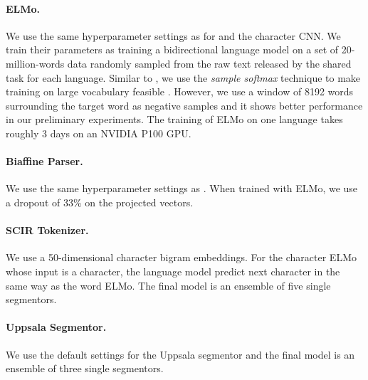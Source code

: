 \documentclass[11pt,a4paper]{article}
\begin{document}
\paragraph{ELMo.}
We use the same hyperparameter settings as \citet{N18-1202} for 
and the character CNN.
We train their parameters
as training a bidirectional language model
on a set of 20-million-words data randomly
sampled from the raw text released by the shared task for each language.
Similar to \citet{N18-1202}, we use the \textit{sample softmax} technique
to make training on large vocabulary feasible \cite{jean-EtAl:2015:ACL-IJCNLP}.
However, we use a window of 8192 words surrounding the target word
as negative samples and it shows better performance in our preliminary experiments.
The training of ELMo on one language takes roughly 3 days on an NVIDIA P100 GPU.

\paragraph{Biaffine Parser.}
We use the same hyperparameter settings
as \citet{dozat-qi-manning:2017:K17-3}.
When trained with ELMo, we use a dropout of 33\% on the projected vectors.

\paragraph{SCIR Tokenizer.}
We use a
50-dimensional character bigram embeddings.
For the character ELMo whose input is a character,
the language model predict next character  in the same way as the word ELMo.
The final model is an ensemble of five single segmentors.

\paragraph{Uppsala Segmentor.}
We use the default settings for the Uppsala segmentor and the
final model is an ensemble of three single segmentors.
\end{document}
